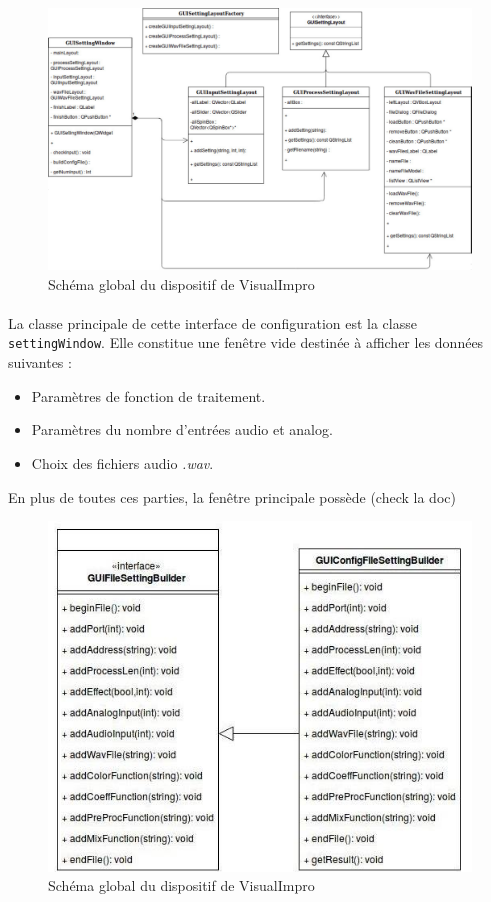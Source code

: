 \begin{figure}[h]
 \centering
 \includegraphics[scale=0.3]{umlSettingWindow.png}
 \caption{Schéma global du dispositif de VisualImpro}
 \label{schéma global}
\end{figure}

\paragraph{}
La classe principale de cette interface de configuration est la
classe \verb!settingWindow!. Elle constitue une fenêtre vide
destinée à afficher les données suivantes :
\begin{itemize}
 \item Paramètres de fonction de traitement.
 \item Paramètres du nombre d'entrées audio et analog.
 \item Choix des fichiers audio \textit{.wav}.
\end{itemize}
En plus de toutes ces parties, la fenêtre principale possède (check la doc)

\begin{figure}[h]
 \centering
 \includegraphics[scale=0.5]{umlBuilder.png}
 \caption{Schéma global du dispositif de VisualImpro}
 \label{schéma global}
\end{figure}

